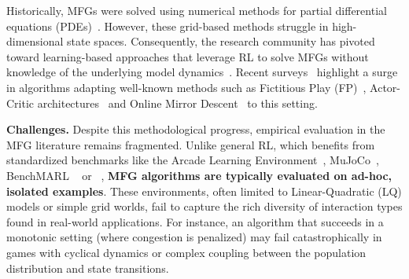 \documentclass[10pt,twocolumn,letterpaper]{article}
\theoremstyle{definition}
\theoremstyle{remark}
\begin{document}
Historically, MFGs were solved using numerical methods for partial differential equations (PDEs)~\citep{achdou2020mean}. However, these grid-based methods struggle in high-dimensional state spaces. Consequently, the research community has pivoted toward learning-based approaches that leverage RL to solve MFGs without knowledge of the underlying model dynamics~\citep{guo2019learningMFG,subramanian2019reinforcementMFG,cui2021approximately}. Recent surveys~\citep{lauriere2022learning} highlight a surge in algorithms adapting well-known methods such as Fictitious Play (FP)~\citep{perrin2021meanflock,lauriere2022scalable,magnino2025solving}, Actor-Critic architectures~\citep{fu2019actorcriticMFG,angiuli2020unifiedRLMFGMFC} and Online Mirror Descent~\citep{hadikhanloo2018learningphd,perolat2021scalingMFGOMD} to this setting.

\textbf{Challenges.} Despite this methodological progress, empirical evaluation in the MFG literature remains fragmented. Unlike general RL, which benefits from standardized benchmarks like the Arcade Learning Environment~\citep{bellemare2013arcade}, MuJoCo~\citep{todorov2012mujoco}, BenchMARL ~\citep{bettini2024benchmarl} or ~\cite{gorsane2022towards}, \textbf{MFG algorithms are typically evaluated on ad-hoc, isolated examples}. These environments, often limited to Linear-Quadratic (LQ) models or simple grid worlds, fail to capture the rich diversity of interaction types found in real-world applications. For instance, an algorithm that succeeds in a monotonic setting (where congestion is penalized) may fail catastrophically in games with cyclical dynamics or complex coupling between the population distribution and state transitions.
\end{document}
